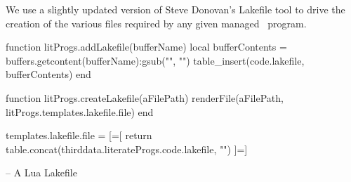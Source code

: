 
\startchapter[title=Lakefile]

We use a slightly updated version of Steve Donovan's Lakefile tool to 
drive the creation of the various files required by any given 
 managed \ConTeXt\ program. 

\startMkIVCode



\setuptyping[Lakefile][option=lua]


\let\oldStopLakefile=\stopLakefile
\def\stopLakefile{%
  \oldStopLakefile%
  \directlua{thirddata.literateProgs.addLakefile('_typing_')}}


\def\createLakefile[#1]{
  \directlua{thirddata.literateProgs.createLakefile('#1')}
}

\stopMkIVCode

\startLuaCode

function litProgs.addLakefile(bufferName)
  local bufferContents = buffers.getcontent(bufferName):gsub("", "\n")
  table_insert(code.lakefile, bufferContents)
end

function litProgs.createLakefile(aFilePath)
  renderFile(aFilePath, litProgs.templates.lakefile.file)
end

\stopLuaCode

\startLuaTemplate

templates.lakefile.file = [=[
{{ return table.concat(thirddata.literateProgs.code.lakefile, "\n\n") }}
]=]

\stopLuaTemplate

\startLakefile
-- A Lua Lakefile

